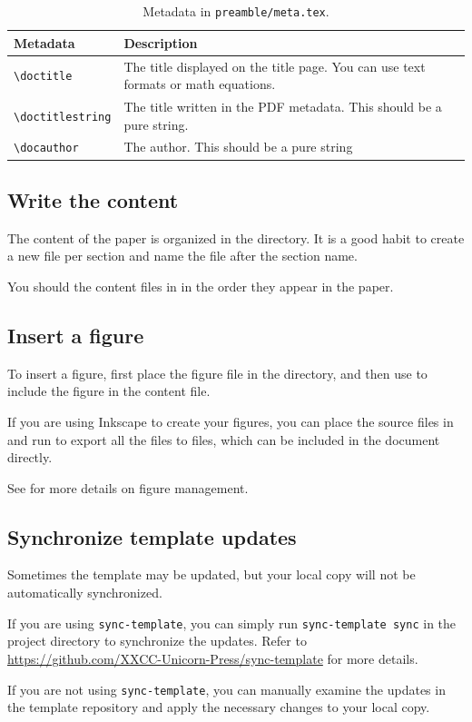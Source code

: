 \begin{table}[!ht]
  \centering

  \begin{tabular}{lp{}}
    \hline\hline
    \textbf{Metadata} & \textbf{Description} \\
    \hline
    \verb|\doctitle| & The title displayed on the title page. You can use text formats or math equations. \\
    \verb|\doctitlestring| & The title written in the PDF metadata. This should be a pure string. \\
    \verb|\docauthor| & The author. This should be a pure string \\
    \hline\hline
  \end{tabular}

  \caption{Metadata in \texttt{preamble/meta.tex}.}
  \label{tab:metadata}
\end{table}

\subsection{Write the content}

The content of the paper is organized in the  directory.
It is a good habit to create a new file per section and name the file after the section name.

You should \macro{} the content files in  in the order they appear in the paper.

\subsection{Insert a figure}

To insert a figure, first place the figure file in the  directory, and then use  to include the figure in the content file.

If you are using Inkscape to create your figures, you can place the source files in  and run  to export all the  files to  files, which can be included in the document directly.

See  for more details on figure management.

\subsection{Synchronize template updates}

Sometimes the template may be updated, but your local copy will not be automatically synchronized.

If you are using \texttt{sync-template}, you can simply run \verb|sync-template sync| in the project directory to synchronize the updates.
Refer to \url{https://github.com/XXCC-Unicorn-Press/sync-template} for more details.

If you are not using \texttt{sync-template}, you can manually examine the updates in the template repository and apply the necessary changes to your local copy.
